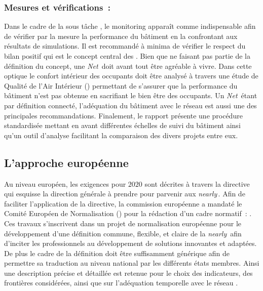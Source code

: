 \subsubsection{Mesures et vérifications~:} %
\label{ssub:mesures_et_verifications}
Dans le cadre de la sous tâche  \parencite{Noris2013}, le monitoring apparaît comme indispensable
afin de vérifier par la mesure la performance du bâtiment en la confrontant aux
résultats de simulations. Il est recommandé à minima de vérifier le respect du bilan
positif qui est le concept central des . Bien que ne faisant pas partie de
la définition du concept, une \textit{Net}\, doit avant tout être agréable à vivre. Dans cette
optique le confort intérieur des occupants doit être analysé à travers une étude de
Qualité de l’Air Intérieur () permettant de s’assurer que la performance du bâtiment n’est pas
obtenue en sacrifiant le bien être des occupants. Un \textit{Net}\, étant par définition connecté,
l’adéquation du bâtiment avec le réseau est aussi une des principales recommandations.
Finalement, le rapport présente une procédure standardisée mettant en avant différentes échelles
de suivi du bâtiment ainsi qu’un outil d’analyse facilitant la comparaison des divers projets entre eux.


\subsection{L’approche européenne} %
\label{ssub:l_approche_europeenne}
Au niveau européen, les exigences pour $2020$ sont décrites à travers la directive
 \parencite{EPBD2010} qui esquisse la direction générale à prendre pour
parvenir aux \textit{nearly}\,. Afin de faciliter l’application de la directive,
la commission européenne a mandaté le Comité Européen de Normalisation () pour la
rédaction d’un cadre normatif~:  \parencite{CEN2013}. Ces travaux
s’inscrivent dans un projet de normalisation européenne pour le développement d’une
définition commune, flexible, et claire de la \textit{nearly}\, afin d’inciter
les professionnels au développement de solutions innovantes et adaptées. De plus le cadre
de la définition doit être suffisamment générique afin de permettre sa traduction au
niveau national par les différents états membres. Ainsi une description précise et
détaillée est retenue pour le choix des indicateurs, des frontières considérées, ainsi que
sur l’adéquation temporelle avec le réseau \parencite{Zirngibl2014}.


